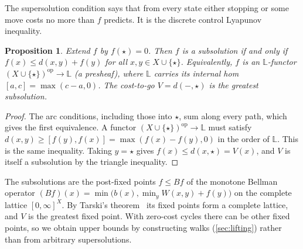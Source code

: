 \documentclass[11pt]{article}
\newtheorem{proposition}[theorem]{Proposition}
\theoremstyle{definition}
\theoremstyle{remark}
\newcommand{\Lq}{\mathbb{L}}           %
\newcommand{\dd}{d}
\newcommand{\tgt}{\star}
\begin{document}
The supersolution condition says that from every state either stopping or some
move costs no more than $f$ predicts. It is the discrete control Lyapunov
inequality.

\begin{proposition}\label{prop:presheaf}
Extend $f$ by $f(\tgt) = 0$. Then $f$ is a subsolution if and only if
$f(x) \le \dd(x,y) + f(y)$ for all $x, y \in X \cup \{\tgt\}$. Equivalently,
$f$ is an $\Lq$-functor $(X \cup\{\tgt\})^{\mathrm{op}} \to \Lq$ (a presheaf),
where $\Lq$ carries its internal hom $[a, c] = \max(c - a, 0)$. The cost-to-go
$V = \dd(-,\tgt)$ is the greatest subsolution.
\end{proposition}
\begin{proof}
The arc conditions, including those into $\tgt$, sum along every path, which gives
the first equivalence. A functor $(X\cup\{\tgt\})^{\mathrm{op}} \to \Lq$ must
satisfy $\dd(x,y) \ge [f(y), f(x)] = \max(f(x) - f(y), 0)$ in the order of $\Lq$.
This is the same inequality. Taking $y = \tgt$ gives $f(x) \le \dd(x,\tgt) = V(x)$,
and $V$ is itself a subsolution by the triangle inequality.
\end{proof}

The subsolutions are the post-fixed points $f \le Bf$ of the monotone Bellman
operator $(Bf)(x) = \min\big(b(x), \min_y W(x,y) + f(y)\big)$ on the complete
lattice $[0,\infty]^X$. By Tarski's theorem~\cite{tarski1955} its fixed points form
a complete lattice, and $V$ is the greatest fixed point. With zero-cost cycles
there can be other fixed points, so we obtain upper bounds by constructing walks
(\cref{sec:lifting}) rather than from arbitrary supersolutions.
\end{document}
